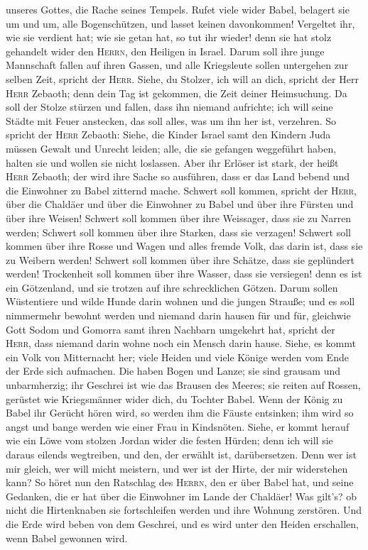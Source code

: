 unseres Gottes, die Rache seines Tempels.  Rufet viele
wider Babel, belagert sie um und um, alle Bogenschützen, und lasset
keinen davonkommen! Vergeltet ihr, wie sie verdient hat; wie sie getan
hat, so tut ihr wieder! denn sie hat stolz gehandelt wider den
\textsc{Herrn}, den Heiligen in Israel.  Darum soll ihre
junge Mannschaft fallen auf ihren Gassen, und alle Kriegsleute sollen
untergehen zur selben Zeit, spricht der \textsc{Herr}. 
Siehe, du Stolzer, ich will an dich, spricht der Herr \textsc{Herr}
Zebaoth; denn dein Tag ist gekommen, die Zeit deiner Heimsuchung.
 Da soll der Stolze stürzen und fallen, dass ihn niemand
aufrichte; ich will seine Städte mit Feuer anstecken, das soll alles,
was um ihn her ist, verzehren.  So spricht der
\textsc{Herr} Zebaoth: Siehe, die Kinder Israel samt den Kindern Juda
müssen Gewalt und Unrecht leiden; alle, die sie gefangen weggeführt
haben, halten sie und wollen sie nicht loslassen.  Aber
ihr Erlöser ist stark, der heißt \textsc{Herr} Zebaoth; der wird ihre
Sache so ausführen, dass er das Land bebend und die Einwohner zu Babel
zitternd mache.  Schwert soll kommen, spricht der
\textsc{Herr}, über die Chaldäer und über die Einwohner zu Babel und
über ihre Fürsten und über ihre Weisen!  Schwert soll
kommen über ihre Weissager, dass sie zu Narren werden; Schwert soll
kommen über ihre Starken, dass sie verzagen!  Schwert
soll kommen über ihre Rosse und Wagen und alles fremde Volk, das darin
ist, dass sie zu Weibern werden! Schwert soll kommen über ihre Schätze,
dass sie geplündert werden!  Trockenheit soll kommen über
ihre Wasser, dass sie versiegen! denn es ist ein Götzenland, und sie
trotzen auf ihre schrecklichen Götzen.  Darum sollen
Wüstentiere und wilde Hunde darin wohnen und die jungen Strauße; und es
soll nimmermehr bewohnt werden und niemand darin hausen für und für,
 gleichwie Gott Sodom und Gomorra samt ihren Nachbarn
umgekehrt hat, spricht der \textsc{Herr}, dass niemand darin wohne noch
ein Mensch darin hause.  Siehe, es kommt ein Volk von
Mitternacht her; viele Heiden und viele Könige werden vom Ende der Erde
sich aufmachen.  Die haben Bogen und Lanze; sie sind
grausam und unbarmherzig; ihr Geschrei ist wie das Brausen des Meeres;
sie reiten auf Rossen, gerüstet wie Kriegsmänner wider dich, du Tochter
Babel.  Wenn der König zu Babel ihr Gerücht hören wird,
so werden ihm die Fäuste entsinken; ihm wird so angst und bange werden
wie einer Frau in Kindsnöten.  Siehe, er kommt herauf wie
ein Löwe vom stolzen Jordan wider die festen Hürden; denn ich will sie
daraus eilends wegtreiben, und den, der erwählt ist, darübersetzen. Denn
wer ist mir gleich, wer will micht meistern, und wer ist der Hirte, der
mir widerstehen kann?  So höret nun den Ratschlag des
\textsc{Herrn}, den er über Babel hat, und seine Gedanken, die er hat
über die Einwohner im Lande der Chaldäer! Was gilt's? ob nicht die
Hirtenknaben sie fortschleifen werden und ihre Wohnung zerstören.
 Und die Erde wird beben von dem Geschrei, und es wird
unter den Heiden erschallen, wenn Babel gewonnen wird.

